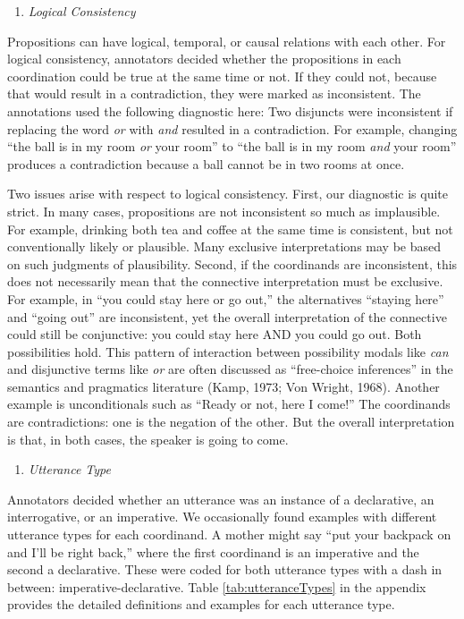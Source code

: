 \documentclass[
  english,
  ,man,floatsintext]{apa6}
\providecommand{\tightlist}{%
  \setlength{\itemsep}{0pt}\setlength{\parskip}{0pt}}
\begin{document}
\begin{enumerate}
\def\labelenumi{\arabic{enumi}.}
\setcounter{enumi}{1}
\tightlist
\item
  \emph{Logical Consistency}
\end{enumerate}

Propositions can have logical, temporal, or causal relations with each other. For logical consistency, annotators decided whether the propositions in each coordination could be true at the same time or not. If they could not, because that would result in a contradiction, they were marked as inconsistent. The annotations used the following diagnostic here: Two disjuncts were inconsistent if replacing the word \emph{or} with \emph{and} resulted in a contradiction. For example, changing ``the ball is in my room \emph{or} your room'' to ``the ball is in my room \emph{and} your room'' produces a contradiction because a ball cannot be in two rooms at once.

Two issues arise with respect to logical consistency. First, our diagnostic is quite strict. In many cases, propositions are not inconsistent so much as implausible. For example, drinking both tea and coffee at the same time is consistent, but not conventionally likely or plausible. Many exclusive interpretations may be based on such judgments of plausibility. Second, if the coordinands are inconsistent, this does not necessarily mean that the connective interpretation must be exclusive. For example, in ``you could stay here or go out,'' the alternatives ``staying here'' and ``going out'' are inconsistent, yet the overall interpretation of the connective could still be conjunctive: you could stay here AND you could go out. Both possibilities hold. This pattern of interaction between possibility modals like \emph{can} and disjunctive terms like \emph{or} are often discussed as ``free-choice inferences'' in the semantics and pragmatics literature (Kamp, 1973; Von Wright, 1968). Another example is unconditionals such as ``Ready or not, here I come!'' The coordinands are contradictions: one is the negation of the other. But the overall interpretation is that, in both cases, the speaker is going to come.

\begin{enumerate}
\def\labelenumi{\arabic{enumi}.}
\setcounter{enumi}{2}
\tightlist
\item
  \emph{Utterance Type}
\end{enumerate}

Annotators decided whether an utterance was an instance of a declarative, an interrogative, or an imperative. We occasionally found examples with different utterance types for each coordinand. A mother might say ``put your backpack on and I'll be right back,'' where the first coordinand is an imperative and the second a declarative. These were coded for both utterance types with a dash in between: imperative-declarative. Table \ref{tab:utteranceTypes} in the appendix provides the detailed definitions and examples for each utterance type.
\end{document}
